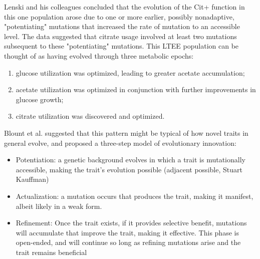 Lenski and his colleagues concluded that the evolution of the Cit+ function in this one population arose due to one or more earlier, possibly nonadaptive, "potentiating" mutations that increased the rate of mutation to an accessible level. The data suggested that citrate usage involved at least two mutations subsequent to these "potentiating" mutations. 
This LTEE population can be thought of as having evolved through three metabolic epochs: 
\begin{enumerate}
\item glucose utilization was optimized, leading to greater acetate accumulation; 
\item acetate utilization was optimized in conjunction with further improvements in glucose growth; 
\item citrate utilization was discovered and optimized. 
\end{enumerate}

Blount et al. suggested that this pattern might be typical of how novel traits in general evolve, and proposed a three-step model of evolutionary innovation: 
\begin{itemize}
\item Potentiation: a genetic background evolves in which a trait is mutationally accessible, making the trait's evolution possible (adjacent possible, Stuart Kauffman)
\item Actualization: a mutation occurs that produces the trait, making it manifest, albeit likely in a weak form. 
\item Refinement: Once the trait exists, if it provides selective benefit, mutations will accumulate that improve the trait, making it effective. This phase is open-ended, and will continue so long as refining mutations arise and the trait remains beneficial 
\end{itemize}
